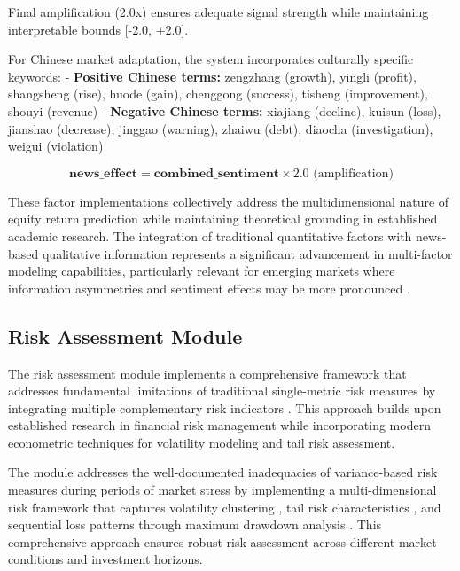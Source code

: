\documentclass[3p,times,procedia]{elsarticle}
\begin{document}
Final amplification (2.0x) ensures adequate signal strength while maintaining interpretable bounds [-2.0, +2.0].

For Chinese market adaptation, the system incorporates culturally specific keywords:
- \textbf{Positive Chinese terms:} zengzhang (growth), yingli (profit), shangsheng (rise), huode (gain), chenggong (success), tisheng (improvement), shouyi (revenue)
- \textbf{Negative Chinese terms:} xiajiang (decline), kuisun (loss), jianshao (decrease), jinggao (warning), zhaiwu (debt), diaocha (investigation), weigui (violation)

\begin{equation}
\textbf{news\_effect} = \textbf{combined\_sentiment} \times 2.0 \text{ (amplification)}
\end{equation}

These factor implementations collectively address the multidimensional nature of equity return prediction while maintaining theoretical grounding in established academic research. The integration of traditional quantitative factors with news-based qualitative information represents a significant advancement in multi-factor modeling capabilities, particularly relevant for emerging markets where information asymmetries and sentiment effects may be more pronounced \cite{Harvey2016}.

\subsection{{Risk Assessment Module}}

The risk assessment module implements a comprehensive framework that addresses fundamental limitations of traditional single-metric risk measures by integrating multiple complementary risk indicators \cite{Jorion2001,Rockafellar2000}. This approach builds upon established research in financial risk management while incorporating modern econometric techniques for volatility modeling and tail risk assessment.

The module addresses the well-documented inadequacies of variance-based risk measures during periods of market stress by implementing a multi-dimensional risk framework that captures volatility clustering \cite{Engle1982}, tail risk characteristics \cite{Rockafellar2000}, and sequential loss patterns through maximum drawdown analysis \cite{Jorion2001}. This comprehensive approach ensures robust risk assessment across different market conditions and investment horizons.
\end{document}
